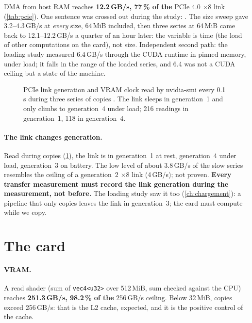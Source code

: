 DMA from host RAM reaches \textbf{12.2\,GB/s, 77\,\% of the} PCIe 4.0 $\times$8 link (\cref{tab:pcie}). One sentence was crossed out during the study: . The size sweep gave 3.2--4.3\,GB/s at \emph{every} size, 64\,MiB included, then three series at 64\,MiB came back to 12.1--12.2\,GB/s a quarter of an hour later: the variable is time (the load of other computations on the card), not size. Independent second path: the loading study measured 6.4\,GB/s through the CUDA runtime in pinned memory, under load; it falls in the range of the loaded series, and 6.4 was not a CUDA ceiling but a state of the machine.

\begin{figure}[ht]
\centering
\GraphePCIe
\caption[PCIe link generation during copies]{PCIe link generation and VRAM clock read by nvidia-smi every 0.1\,s during three series of copies \mes. The link sleeps in generation~1 and only climbs to generation~4 under load; 216 readings in generation~1, 118 in generation~4.}
\label{fig:pcie-gen}
\end{figure}

\paragraph{The link changes generation.} Read during copies (\cref{fig:pcie-gen}), the link is in generation~1 at rest, generation~4 under load, generation~3 on battery. The low level of about 3.8\,GB/s of the slow series resembles the ceiling of a generation~2 $\times$8 link (4\,GB/s); not proven. \textbf{Every transfer measurement must record the link generation during the measurement, not before.} The loading study saw it too (\cref{ch:chargement}): a pipeline that only copies leaves the link in generation~3; the card must compute while we copy.

\section{The card}\label{sec:carte}

\paragraph{VRAM.} A read shader (sum of \texttt{vec4<u32>} over 512\,MiB, sum checked against the CPU) reaches \textbf{251.3\,GB/s, 98.2\,\% of the} 256\,GB/s ceiling. Below 32\,MiB, copies exceed 256\,GB/s: that is the L2 cache, expected, and it is the positive control of the cache.

